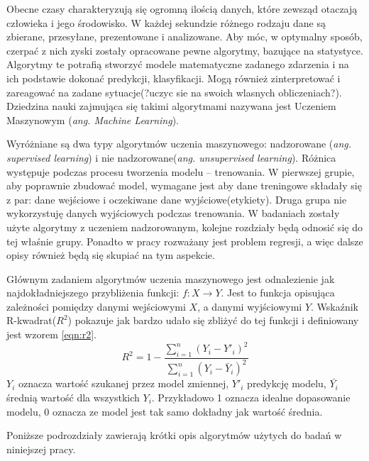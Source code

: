 Obecne czasy charakteryzują się ogromną ilością danych, które zewsząd otaczają człowieka i jego środowisko. W każdej sekundzie różnego rodzaju dane są zbierane, przesyłane, prezentowane i analizowane. Aby móc, w optymalny sposób, czerpać z nich zyski zostały opracowane pewne algorytmy, bazujące na statystyce. Algorytmy te potrafią stworzyć modele matematyczne zadanego zdarzenia i na ich podstawie dokonać predykcji, klasyfikacji. Mogą również zinterpretować i zareagować na zadane sytuacje(?uczyc sie na swoich wlasnych obliczeniach?). Dziedzina nauki zajmująca się takimi algorytmami nazywana jest Uczeniem Maszynowym ({\em ang. Machine Learning}).\par
Wyróżniane są dwa typy algorytmów uczenia maszynowego: nadzorowane ({\em ang. supervised learning}) i nie nadzorowane({\em ang. unsupervised learning}). Różnica występuje podczas procesu tworzenia modelu -- trenowania. W pierwszej grupie, aby poprawnie zbudować model, wymagane jest aby dane treningowe składały się z par: dane wejściowe i oczekiwane dane wyjściowe(etykiety). Druga grupa nie wykorzystuję danych wyjściowych podczas trenowania. W badaniach zostały użyte algorytmy z uczeniem nadzorowanym, kolejne rozdziały będą odnosić się do tej właśnie grupy. Ponadto w pracy rozważany jest problem regresji, a więc dalsze opisy również będą się skupiać na tym aspekcie. \par
Głównym zadaniem algorytmów uczenia maszynowego jest odnalezienie jak najdokładniejszego przybliżenia funkcji: $f \colon X \to Y$. Jest to funkcja opisująca zależności pomiędzy danymi wejściowymi $X$, a danymi wyjściowymi $Y$\cite{ml_supervised}. Wskaźnik R-kwadrat($R^2$) pokazuje jak bardzo udało się zbliżyć do tej funkcji i definiowany jest wzorem \ref{eqn:r2}. 
\begin{equation}
\label{eqn:r2}
R^2=1- \frac{ \sum_{i=1}^{n}(Y_i-Y'_i)^2}{\sum_{i=1}^{n}(Y_i-\bar{Y}_i)^2 }
\end{equation}
$Y_i$ oznacza wartość szukanej przez model zmiennej, $Y'_i$ predykcję modelu, $\bar{Y_i}$ średnią wartość dla wszystkich $Y_i$. Przykładowo 1 oznacza idealne dopasowanie modelu, 0 oznacza ze model jest tak samo dokładny jak wartość średnia.\par
Poniższe podrozdziały zawierają krótki opis algorytmów użytych do badań w niniejszej pracy.



